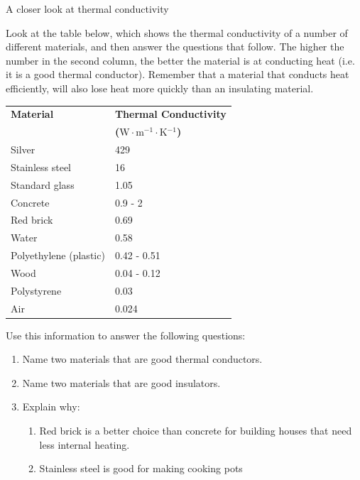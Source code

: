 \label{m38706*secfhsst!!!underscore!!!id492}
            \begin{Investigation}{A closer look at thermal conductivity}
{            \nopagebreak
      \label{m38706*id66744}Look at the table below, which shows the thermal conductivity of a number of different materials, and then answer the questions that follow. The higher the number in the second column, the better the material is at conducting heat (i.e. it is a good thermal conductor). Remember that a material that conducts heat efficiently, will also lose heat more quickly than an insulating material.\par 
          \begin{table}[H]
        \begin{center}
      \label{m38706*id66753}
    \noindent
      \begin{tabular}{|l|l|}\hline
\textbf{Material} & \textbf{Thermal Conductivity} \\ 
                 &  \textbf{($\text{W}\ensuremath{\cdot}\text{m}{}^{-1}\ensuremath{\cdot}\text{K}{}^{-1}$) } \\ \hline
Silver & 429 \\ \hline
Stainless steel & 16 \\ \hline
Standard glass & 1.05 \\ \hline
Concrete & 0.9 - 2 \\ \hline
Red brick & 0.69 \\ \hline
Water & 0.58 \\ \hline
Polyethylene (plastic) & 0.42 - 0.51 \\ \hline
Wood & 0.04 - 0.12 \\ \hline
Polystyrene & 0.03 \\ \hline
Air & 0.024 \\ \hline
    \end{tabular}
      \end{center}
\end{table}
      \label{m38706*id67009}Use this information to answer the following questions:
      \label{m38706*id67013}\begin{enumerate}[noitemsep, label=\textbf{\arabic*}. ] 
            \label{m38706*uid105}\item Name two materials that are good thermal conductors.
\label{m38706*uid106}\item Name two materials that are good insulators.
\label{m38706*uid107}\item Explain why:
\label{m38706*id67053}\begin{enumerate}[noitemsep, label=\textbf{\alph*}. ] 
            \label{m38706*uid108}\item Red brick is a better choice than concrete for building houses that need less internal heating. 
\label{m38706*uid109}\item Stainless steel is good for making cooking pots
\end{enumerate}
        \end{enumerate}}
\end{Investigation}

